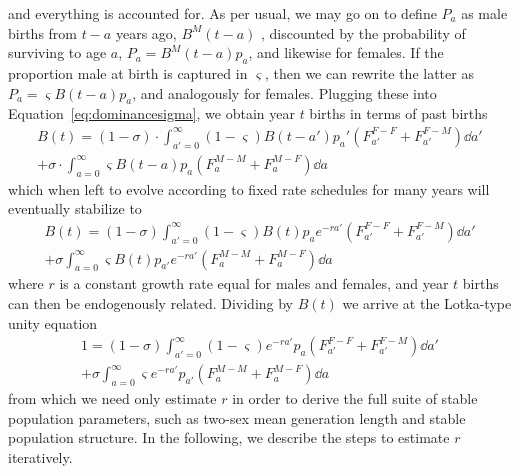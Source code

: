 and everything is accounted for. As per usual, we may go on to define $P_a$ as
male births from $t-a$ years ago, $B^M(t-a)$ , discounted by the probability of
surviving to age $a$, $P_a = B^M(t-a)p_a$, and likewise for females. If the
proportion male at birth is captured in $\varsigma$, then we can rewrite the
latter as $P_a = \varsigma B(t-a)p_a$, and analogously for females. Plugging
these into Equation~\eqref{eq:dominancesigma}, we obtain year $t$ births in
terms of past births
\begin{equation}
\label{eq:dominancebirths}
\begin{split}
B(t) = (1-\sigma) \cdot \int_{a'=0}^\infty (1-\varsigma) B(t-a')p_a'
(F_{a'}^{F-F}+F_{a'}^{F-M}) \dd a' \\
+ \sigma \cdot \int_{a=0}^\infty \varsigma B(t-a)p_a (F_a^{M-M}+F_a^{M-F}) \dd
a
\end{split}
\end{equation}
which when left to evolve according to fixed rate schedules for many years will
eventually stabilize to
\begin{equation}
\label{eq:dominancebirthsstab}
\begin{split}
B(t) = (1-\sigma) \int_{a'=0}^\infty (1-\varsigma) B(t)p_ae^{-ra'}
(F_{a'}^{F-F}+F_{a'}^{F-M}) \dd a' \\
+ \sigma \int_{a=0}^\infty \varsigma B(t)p_{a'}e^{-ra'}
(F_a^{M-M}+F_a^{M-F}) \dd a
\end{split}
\end{equation}
where $r$ is a constant growth rate equal for males and females, and year $t$
births can then be endogenously related. Dividing by $B(t)$ we arrive at the
Lotka-type unity equation
\begin{equation}
\label{eq:goodmanunity}
\begin{split}
1 = (1-\sigma) \int_{a'=0}^\infty (1-\varsigma) e^{-ra'}p_a
(F_{a'}^{F-F}+F_{a'}^{F-M}) \dd a' \\
+ \sigma \int_{a=0}^\infty \varsigma e^{-ra'}p_{a'} (F_a^{M-M}+F_a^{M-F})
\dd a
\end{split}
\end{equation}
from which we need only estimate $r$ in order to derive the full suite of stable
population parameters, such as two-sex mean generation length and stable
population structure. In the following, we describe the steps to estimate $r$
iteratively.


